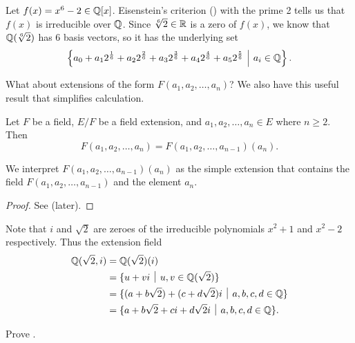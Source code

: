 \begin{example}
    Let $f(x) = x^6 - 2 \in \mathbb{Q}[x]$. Eisenstein's criterion () with the prime 2 tells us that $f(x)$ is irreducible over $\mathbb{Q}$. Since $\sqrt[6]2 \in \mathbb{R}$ is a zero of $f(x)$, we know that $\mathbb{Q}(\sqrt[6]2)$ has 6 basis vectors, so it has the underlying set
    \[
        \left\{a_0 + a_12^{\frac16} + a_22^{\frac26} + a_32^{\frac36} + a_42^{\frac46} + a_52^{\frac56} \vert a_i \in \Q\right\}.
    \]
\end{example}

What about extensions of the form $F(a_1, a_2, \dots, a_n)$? We also have this useful result that simplifies calculation.
\begin{proposition}\label{prop-field-generated-by-S-inductive-definition}
    Let $F$ be a field, $E/F$ be a field extension, and $a_1, a_2, \dots, a_n \in E$ where $n \geq 2$. Then
    \[
        F(a_1, a_2, \dots, a_n) = F(a_1, a_2, \dots, a_{n-1})(a_n).
    \]
\end{proposition}
\begin{remark}
    We interpret $F(a_1, a_2, \dots, a_{n-1})(a_n)$ as the simple extension that contains the field $F(a_1, a_2, \dots, a_{n-1})$ and the element $a_n$.
\end{remark}
\begin{proof}
    See  (later).
\end{proof}

\begin{example}
    Note that $i$ and $\sqrt 2$ are zeroes of the irreducible polynomials $x^2 + 1$ and $x^2 - 2$ respectively. Thus the extension field
    \begin{align*}
        \Q(\sqrt 2, i) &= \Q(\sqrt 2)(i)\\
        &= \{u + vi \vert u,v \in \Q(\sqrt2)\}\\
        &= \{(a+b\sqrt2) + (c+d\sqrt2)i \vert a, b, c, d \in \Q\}\\
        &= \{a + b\sqrt2 + ci + d\sqrt2i \vert a, b, c, d \in \Q\}.
    \end{align*}
\end{example}

\begin{exercise}\label{exercise-field-generated-by-S-inductive-definition}
    Prove .
\end{exercise}



